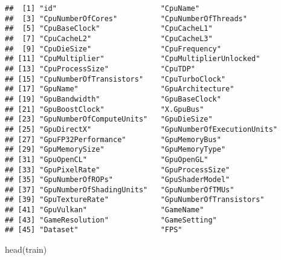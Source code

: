 \documentclass[
]{article}
\newenvironment{Shaded}{\begin{snugshade}}{\end{snugshade}}
\newcommand{\FunctionTok}[1]{\textcolor[rgb]{0.00,0.00,0.00}{#1}}
\newcommand{\NormalTok}[1]{#1}
\begin{document}
\begin{verbatim}
##  [1] "id"                        "CpuName"                  
##  [3] "CpuNumberOfCores"          "CpuNumberOfThreads"       
##  [5] "CpuBaseClock"              "CpuCacheL1"               
##  [7] "CpuCacheL2"                "CpuCacheL3"               
##  [9] "CpuDieSize"                "CpuFrequency"             
## [11] "CpuMultiplier"             "CpuMultiplierUnlocked"    
## [13] "CpuProcessSize"            "CpuTDP"                   
## [15] "CpuNumberOfTransistors"    "CpuTurboClock"            
## [17] "GpuName"                   "GpuArchitecture"          
## [19] "GpuBandwidth"              "GpuBaseClock"             
## [21] "GpuBoostClock"             "X.GpuBus"                 
## [23] "GpuNumberOfComputeUnits"   "GpuDieSize"               
## [25] "GpuDirectX"                "GpuNumberOfExecutionUnits"
## [27] "GpuFP32Performance"        "GpuMemoryBus"             
## [29] "GpuMemorySize"             "GpuMemoryType"            
## [31] "GpuOpenCL"                 "GpuOpenGL"                
## [33] "GpuPixelRate"              "GpuProcessSize"           
## [35] "GpuNumberOfROPs"           "GpuShaderModel"           
## [37] "GpuNumberOfShadingUnits"   "GpuNumberOfTMUs"          
## [39] "GpuTextureRate"            "GpuNumberOfTransistors"   
## [41] "GpuVulkan"                 "GameName"                 
## [43] "GameResolution"            "GameSetting"              
## [45] "Dataset"                   "FPS"
\end{verbatim}

\begin{Shaded}
\begin{Highlighting}[]
\FunctionTok{head}\NormalTok{(train)}
\end{Highlighting}
\end{Shaded}
\end{document}
